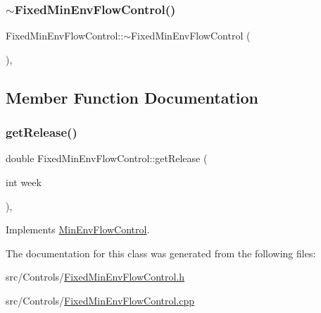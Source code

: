\subsubsection{\texorpdfstring{$\sim$\+Fixed\+Min\+Env\+Flow\+Control()}{~FixedMinEnvFlowControl()}}
{\footnotesize\ttfamily Fixed\+Min\+Env\+Flow\+Control\+::$\sim$\+Fixed\+Min\+Env\+Flow\+Control (\begin{DoxyParamCaption}{ }\end{DoxyParamCaption})\hspace{0.3cm}{\ttfamily [override]}, {\ttfamily [default]}}



\subsection{Member Function Documentation}
\mbox{\label{classFixedMinEnvFlowControl_af3ef98eef6a7124738a3b54dcadf757f}} 
\subsubsection{\texorpdfstring{get\+Release()}{getRelease()}}
{\footnotesize\ttfamily double Fixed\+Min\+Env\+Flow\+Control\+::get\+Release (\begin{DoxyParamCaption}\item[{int}]{week }\end{DoxyParamCaption})\hspace{0.3cm}{\ttfamily [override]}, {\ttfamily [virtual]}}



Implements \mbox{\hyperlink{classMinEnvFlowControl_a5de79615852eb0c937dd559a9eb9402d}{Min\+Env\+Flow\+Control}}.



The documentation for this class was generated from the following files\+:\begin{DoxyCompactItemize}
\item 
src/\+Controls/\mbox{\hyperlink{FixedMinEnvFlowControl_8h}{Fixed\+Min\+Env\+Flow\+Control.\+h}}\item 
src/\+Controls/\mbox{\hyperlink{FixedMinEnvFlowControl_8cpp}{Fixed\+Min\+Env\+Flow\+Control.\+cpp}}\end{DoxyCompactItemize}
